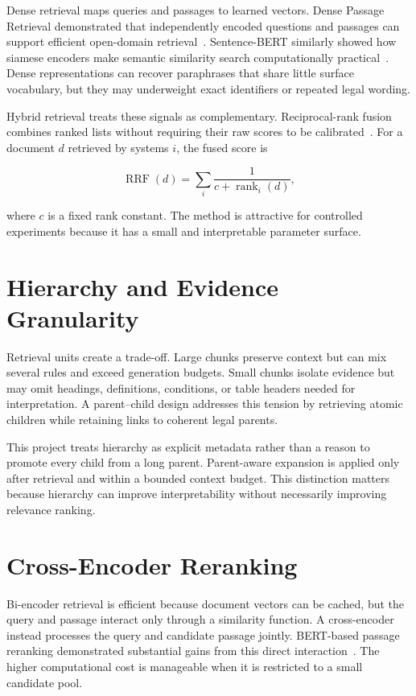 Dense retrieval maps queries and passages to learned vectors. Dense Passage Retrieval demonstrated that independently encoded questions and passages can support efficient open-domain retrieval~\cite{karpukhin2020dpr}. Sentence-BERT similarly showed how siamese encoders make semantic similarity search computationally practical~\cite{reimers2019sentencebert}. Dense representations can recover paraphrases that share little surface vocabulary, but they may underweight exact identifiers or repeated legal wording.

Hybrid retrieval treats these signals as complementary. Reciprocal-rank fusion combines ranked lists without requiring their raw scores to be calibrated~\cite{cormack2009rrf}. For a document $d$ retrieved by systems $i$, the fused score is

\begin{equation}
  \operatorname{RRF}(d) = \sum_i \frac{1}{c + \operatorname{rank}_i(d)},
  \label{eq:rrf}
\end{equation}

where $c$ is a fixed rank constant. The method is attractive for controlled experiments because it has a small and interpretable parameter surface.

\section{Hierarchy and Evidence Granularity}

Retrieval units create a trade-off. Large chunks preserve context but can mix several rules and exceed generation budgets. Small chunks isolate evidence but may omit headings, definitions, conditions, or table headers needed for interpretation. A parent--child design addresses this tension by retrieving atomic children while retaining links to coherent legal parents.

This project treats hierarchy as explicit metadata rather than a reason to promote every child from a long parent. Parent-aware expansion is applied only after retrieval and within a bounded context budget. This distinction matters because hierarchy can improve interpretability without necessarily improving relevance ranking.

\section{Cross-Encoder Reranking}

Bi-encoder retrieval is efficient because document vectors can be cached, but the query and passage interact only through a similarity function. A cross-encoder instead processes the query and candidate passage jointly. BERT-based passage reranking demonstrated substantial gains from this direct interaction~\cite{nogueira2019reranking}. The higher computational cost is manageable when it is restricted to a small candidate pool.

